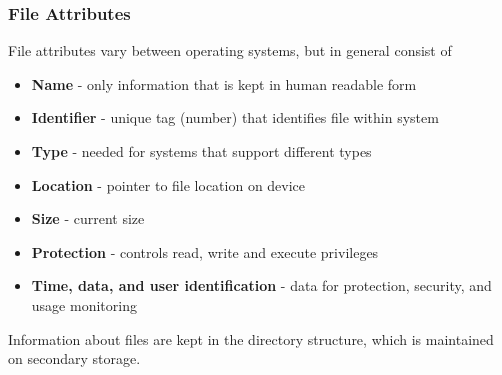 \documentclass[oneside]{book}
\begin{document}
                \subsubsection{File Attributes}
                    File attributes vary between operating systems, but in general consist of 
                    \begin{itemize}
                        \item \textbf{Name} - only information that is kept in human readable form
                        \item \textbf{Identifier} - unique tag (number) that identifies file within system
                        \item \textbf{Type} - needed for systems that support different types
                        \item \textbf{Location} - pointer to file location on device
                        \item \textbf{Size} - current size
                        \item \textbf{Protection} - controls read, write and execute privileges
                        \item \textbf{Time, data, and user identification} - data for protection, security, and usage monitoring
                    \end{itemize}
                    Information about files are kept in the directory structure, which is maintained on secondary storage.
\end{document}
